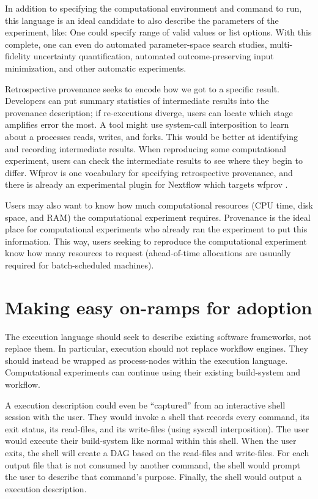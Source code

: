 \documentclass[natbib=false,manuscript,authordraft]{acmart}
\begin{document}
In addition to specifying the computational environment and command to
run, this language is an ideal candidate to also describe the parameters
of the experiment, like: One could specify range of valid values or list
options. With this complete, one can even do automated parameter-space
search studies, multi-fidelity uncertainty quantification, automated
outcome-preserving input minimization, and other automatic experiments.

Retrospective provenance seeks to encode how we got to a specific
result. Developers can put summary statistics of intermediate results
into the provenance description; if re-executions diverge, users can
locate which stage amplifies error the most. A tool might use
system-call interposition to learn about a processes reads, writes, and
forks. This would be better at identifying and recording intermediate
results. When reproducing some computational experiment, users can check
the intermediate results to see where they begin to differ. Wfprov is
one vocabulary for specifying retrospective provenance, and there is
already an experimental plugin for Nextflow which targets wfprov
\cite{grande_nf-prov_2023}.

Users may also want to know how much computational resources (CPU time,
disk space, and RAM) the computational experiment requires. Provenance
is the ideal place for computational experiments who already ran the
experiment to put this information. This way, users seeking to reproduce
the computational experiment know how many resources to request
(ahead-of-time allocations are usuually required for batch-scheduled
machines).

\hypertarget{making-easy-on-ramps-for-adoption}{%
\section{Making easy on-ramps for
adoption}\label{making-easy-on-ramps-for-adoption}}

The execution language should seek to describe existing software
frameworks, not replace them. In particular, execution should not
replace workflow engines. They should instead be wrapped as
process-nodes within the execution language. Computational experiments
can continue using their existing build-system and workflow.

A execution description could even be ``captured'' from an interactive
shell session with the user. They would invoke a shell that records
every command, its exit status, its read-files, and its write-files
(using syscall interposition). The user would execute their build-system
like normal within this shell. When the user exits, the shell will
create a DAG based on the read-files and write-files. For each output
file that is not consumed by another command, the shell would prompt the
user to describe that command's purpose. Finally, the shell would output
a execution description.
\end{document}
